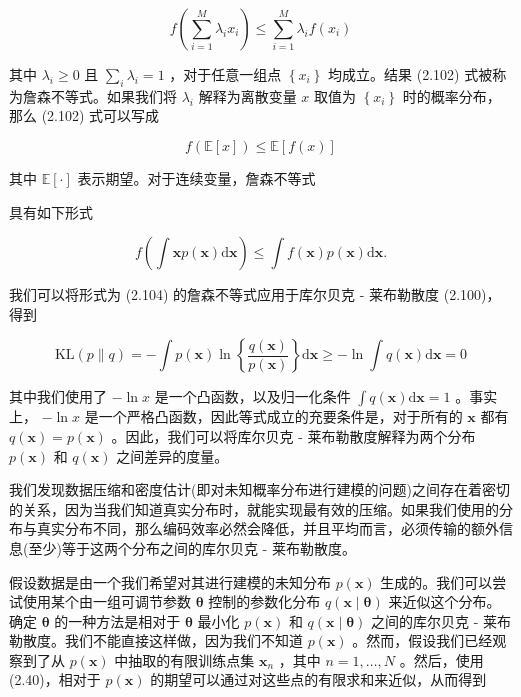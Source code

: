 \documentclass[10pt]{report}
\begin{document}
\[
f\left( {\mathop{\sum }\limits_{{i = 1}}^{M}{\lambda }_{i}{x}_{i}}\right)  \leq  \mathop{\sum }\limits_{{i = 1}}^{M}{\lambda }_{i}f\left( {x}_{i}\right)  \tag{2.102}
\]

其中 \({\lambda }_{i} \geq  0\) 且 \(\mathop{\sum }\limits_{i}{\lambda }_{i} = 1\) ，对于任意一组点 \(\left\{  {x}_{i}\right\}\) 均成立。结果 (2.102) 式被称为詹森不等式。如果我们将 \({\lambda }_{i}\) 解释为离散变量 \(x\) 取值为 \(\left\{  {x}_{i}\right\}\) 时的概率分布，那么 (2.102) 式可以写成

\[
f\left( {\mathbb{E}\left\lbrack  x\right\rbrack  }\right)  \leq  \mathbb{E}\left\lbrack  {f\left( x\right) }\right\rbrack   \tag{2.103}
\]

其中 \(\mathbb{E}\left\lbrack  \cdot \right\rbrack\) 表示期望。对于连续变量，詹森不等式

具有如下形式

\[
f\left( {\int \mathbf{x}p\left( \mathbf{x}\right) \mathrm{d}\mathbf{x}}\right)  \leq  \int f\left( \mathbf{x}\right) p\left( \mathbf{x}\right) \mathrm{d}\mathbf{x}. \tag{2.104}
\]

我们可以将形式为 (2.104) 的詹森不等式应用于库尔贝克 - 莱布勒散度 (2.100)，得到

\[
\mathrm{{KL}}\left( {p\parallel q}\right)  =  - \int p\left( \mathbf{x}\right) \ln \left\{  \frac{q\left( \mathbf{x}\right) }{p\left( \mathbf{x}\right) }\right\}  \mathrm{d}\mathbf{x} \geq   - \ln \int q\left( \mathbf{x}\right) \mathrm{d}\mathbf{x} = 0 \tag{2.105}
\]

其中我们使用了 \(- \ln x\) 是一个凸函数，以及归一化条件 \(\int q\left( \mathbf{x}\right) \mathrm{d}\mathbf{x} = 1\) 。事实上， \(- \ln x\) 是一个严格凸函数，因此等式成立的充要条件是，对于所有的 \(\mathbf{x}\) 都有 \(q\left( \mathbf{x}\right)  = p\left( \mathbf{x}\right)\) 。因此，我们可以将库尔贝克 - 莱布勒散度解释为两个分布 \(p\left( \mathbf{x}\right)\) 和 \(q\left( \mathbf{x}\right)\) 之间差异的度量。

我们发现数据压缩和密度估计(即对未知概率分布进行建模的问题)之间存在着密切的关系，因为当我们知道真实分布时，就能实现最有效的压缩。如果我们使用的分布与真实分布不同，那么编码效率必然会降低，并且平均而言，必须传输的额外信息(至少)等于这两个分布之间的库尔贝克 - 莱布勒散度。

假设数据是由一个我们希望对其进行建模的未知分布 \(p\left( \mathbf{x}\right)\) 生成的。我们可以尝试使用某个由一组可调节参数 \(\mathbf{\theta }\) 控制的参数化分布 \(q\left( {\mathbf{x} \mid  \mathbf{\theta }}\right)\) 来近似这个分布。确定 \(\mathbf{\theta }\) 的一种方法是相对于 \(\mathbf{\theta }\) 最小化 \(p\left( \mathbf{x}\right)\) 和 \(q\left( {\mathbf{x} \mid  \mathbf{\theta }}\right)\) 之间的库尔贝克 - 莱布勒散度。我们不能直接这样做，因为我们不知道 \(p\left( \mathbf{x}\right)\) 。然而，假设我们已经观察到了从 \(p\left( \mathbf{x}\right)\) 中抽取的有限训练点集 \({\mathbf{x}}_{n}\) ，其中 \(n = 1,\ldots ,N\) 。然后，使用 (2.40)，相对于 \(p\left( \mathbf{x}\right)\) 的期望可以通过对这些点的有限求和来近似，从而得到
\end{document}
